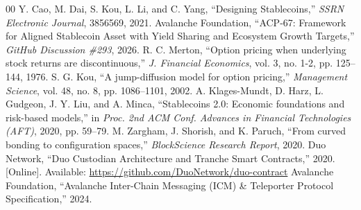 \documentclass[10pt,journal,compsoc]{IEEEtran}
\begin{document}
\begin{thebibliography}{00}
 Y. Cao, M. Dai, S. Kou, L. Li, and C. Yang, ``Designing Stablecoins,'' \textit{SSRN Electronic Journal}, 3856569, 2021.
 Avalanche Foundation, ``ACP-67: Framework for Aligned Stablecoin Asset with Yield Sharing and Ecosystem Growth Targets,'' \textit{GitHub Discussion \#293}, 2026.
 R. C. Merton, ``Option pricing when underlying stock returns are discontinuous,'' \textit{J. Financial Economics}, vol. 3, no. 1-2, pp. 125--144, 1976.
 S. G. Kou, ``A jump-diffusion model for option pricing,'' \textit{Management Science}, vol. 48, no. 8, pp. 1086--1101, 2002.
 A. Klages-Mundt, D. Harz, L. Gudgeon, J. Y. Liu, and A. Minca, ``Stablecoins 2.0: Economic foundations and risk-based models,'' in \textit{Proc. 2nd ACM Conf. Advances in Financial Technologies (AFT)}, 2020, pp. 59--79.
 M. Zargham, J. Shorish, and K. Paruch, ``From curved bonding to configuration spaces,'' \textit{BlockScience Research Report}, 2020.
 Duo Network, ``Duo Custodian Architecture and Tranche Smart Contracts,'' 2020. [Online]. Available: \url{https://github.com/DuoNetwork/duo-contract}
 Avalanche Foundation, ``Avalanche Inter-Chain Messaging (ICM) \& Teleporter Protocol Specification,'' 2024.
\end{thebibliography}
\end{document}
